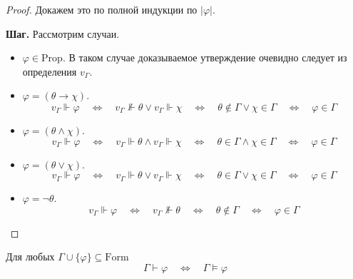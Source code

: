 \documentclass[12pt,a4paper]{article}
\newcommand{\Prop}{\ensuremath{\mathrm{Prop}}\xspace}
\newcommand{\Formul}{\ensuremath{\mathrm{Form}}\xspace}
\begin{document}
    \begin{proof}
        Докажем это по полной индукции по $|\varphi|$.

        \textbf{Шаг.} Рассмотрим случаи.
        \begin{itemize}
            \item $\varphi \in \Prop$. В таком случае доказываемое утверждение очевидно следует из определения $v_\Gamma$.
            \item $\varphi = (\theta \rightarrow \chi)$.
            \[
                v_\Gamma \Vdash \varphi
                \quad \Longleftrightarrow \quad
                v_\Gamma \nVdash \theta \vee v_\Gamma \Vdash \chi
                \quad \Longleftrightarrow \quad
                \theta \notin \Gamma \vee \chi \in \Gamma
                \quad \Longleftrightarrow \quad
                \varphi \in \Gamma
            \]
            \item $\varphi = (\theta \wedge \chi)$.
            \[
                v_\Gamma \Vdash \varphi
                \quad \Longleftrightarrow \quad
                v_\Gamma \Vdash \theta \wedge v_\Gamma \Vdash \chi
                \quad \Longleftrightarrow \quad
                \theta \in \Gamma \wedge \chi \in \Gamma
                \quad \Longleftrightarrow \quad
                \varphi \in \Gamma
            \]
            \item $\varphi = (\theta \vee \chi)$.
            \[
                v_\Gamma \Vdash \varphi
                \quad \Longleftrightarrow \quad
                v_\Gamma \Vdash \theta \vee v_\Gamma \Vdash \chi
                \quad \Longleftrightarrow \quad
                \theta \in \Gamma \vee \chi \in \Gamma
                \quad \Longleftrightarrow \quad
                \varphi \in \Gamma
            \]
            \item $\varphi = \neg \theta$.
            \[
                v_\Gamma \Vdash \varphi
                \quad \Longleftrightarrow \quad
                v_\Gamma \nVdash \theta
                \quad \Longleftrightarrow \quad
                \theta \notin \Gamma
                \quad \Longleftrightarrow \quad
                \varphi \in \Gamma
            \]
        \end{itemize}
    \end{proof}

    \begin{theorem}
        Для любых $\Gamma \cup \{\varphi\} \subseteq \Formul$
        \[
            \Gamma \vdash \varphi
            \quad \Longleftrightarrow \quad
            \Gamma \vDash \varphi
        \]
    \end{theorem}
\end{document}
